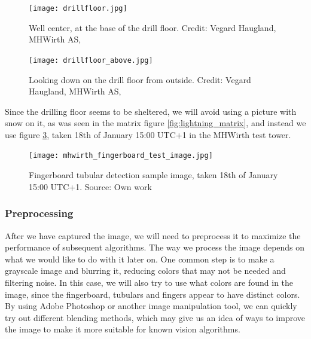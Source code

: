 \begin{figure}[ht]
    \centering
    \texttt{[image: drillfloor.jpg]}
    \caption{Well center, at the base of the drill floor. Credit: Vegard Haugland, MHWirth AS, \citet{hauglandfoto15}}
    \label{fig:wellcenter}
\end{figure}
\FloatBarrier

\begin{figure}[ht]
    \centering
    \texttt{[image: drillfloor\_above.jpg]}
    \caption{Looking down on the drill floor from outside. Credit: Vegard Haugland, MHWirth AS, \citet{hauglandfoto15}}
    \label{fig:drillfloor_above}
\end{figure}
\FloatBarrier

Since the drilling floor seems to be sheltered, we will avoid using a picture with snow on it, as was seen in the matrix figure \ref{fig:lightning_matrix}, and instead we use figure \ref{fig:mhwirth_fingerboard_test_image}, taken 18th of January 15:00 UTC+1 in the MHWirth test tower.

\begin{figure}[ht]
    \centering
    \texttt{[image: mhwirth\_fingerboard\_test\_image.jpg]}
    \caption{Fingerboard tubular detection sample image, taken 18th of January 15:00 UTC+1. Source: Own work}
    \label{fig:mhwirth_fingerboard_test_image}
\end{figure}
\FloatBarrier


\subsubsection{Preprocessing}
After we have captured the image, we will need to preprocess it to maximize the performance of subsequent algorithms. The way we process the image depends on what we would like to do with it later on. One common step is to make a grayscale image and blurring it, reducing colors that may not be needed and filtering noise. In this case, we will also try to use what colors are found in the image, since the fingerboard, tubulars and fingers appear to have distinct colors. By using Adobe Photoshop or another image manipulation tool, we can quickly try out different blending methods, which may give us an idea of ways to improve the image to make it more suitable for known vision algorithms.


